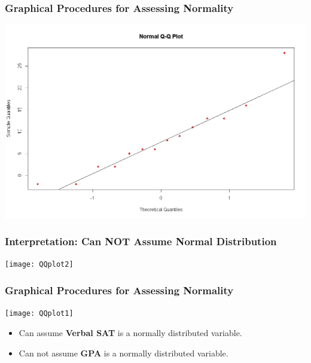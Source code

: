 \documentclass[a4]{beamer}
\begin{document}
\begin{frame}
\frametitle{Graphical Procedures for Assessing Normality}

\begin{center}
\includegraphics[scale=0.32]{10AQQplot}
\end{center}
\end{frame}


\begin{frame}
	\frametitle{Interpretation: Can NOT Assume Normal Distribution}
	
	\begin{center}
		\texttt{[image: QQplot2]}
	\end{center}
\end{frame}


\begin{frame}
	\frametitle{Graphical Procedures for Assessing Normality}
	
	\begin{center}
		\texttt{[image: QQplot1]}
	\end{center}
\begin{itemize}
	\item Can assume \textbf{Verbal SAT} is a normally distributed variable.
	\item Can not assume \textbf{GPA} is a normally distributed variable.
\end{itemize}
\end{frame}
\end{document}
